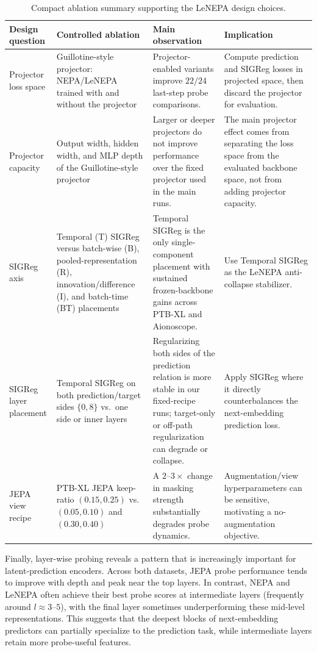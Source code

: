 \documentclass[sigconf,anonymous,review]{acmart}
\begin{document}
\begin{table}[t]
\centering
\small
\caption{Compact ablation summary supporting the LeNEPA design choices.}
\label{tab:ablation_summary}
\setlength{\tabcolsep}{4pt}
\renewcommand{\arraystretch}{1.12}
\begin{tabularx}{\textwidth}{p{} p{} p{} X}
\toprule
Design question & Controlled ablation & Main observation & Implication \\
\midrule
Projector loss space
& Guillotine-style projector: NEPA/LeNEPA trained with and without the projector
& Projector-enabled variants improve $22/24$ last-step probe comparisons.
& Compute prediction and SIGReg losses in projected space, then discard the projector for evaluation. \\
\addlinespace
Projector capacity
& Output width, hidden width, and MLP depth of the Guillotine-style projector
& Larger or deeper projectors do not improve performance over the fixed projector used in the main runs.
& The main projector effect comes from separating the loss space from the evaluated backbone space, not from adding projector capacity. \\
\addlinespace
SIGReg axis
& Temporal (T) SIGReg versus batch-wise (B), pooled-representation (R), innovation/difference (I), and batch-time (BT) placements
& Temporal SIGReg is the only single-component placement with sustained frozen-backbone gains across PTB-XL and Aionoscope.
& Use Temporal SIGReg as the LeNEPA anti-collapse stabilizer. \\
\addlinespace
SIGReg layer placement
& Temporal SIGReg on both prediction/target sides $\{0,8\}$ vs.\ one side or inner layers
& Regularizing both sides of the prediction relation is more stable in our fixed-recipe runs; target-only or off-path regularization can degrade or collapse.
& Apply SIGReg where it directly counterbalances the next-embedding prediction loss. \\
\addlinespace
JEPA view recipe
& PTB-XL JEPA keep-ratio $(0.15,0.25)$ vs.\ $(0.05,0.10)$ and $(0.30,0.40)$
& A $2$--$3\times$ change in masking strength substantially degrades probe dynamics.
& Augmentation/view hyperparameters can be sensitive, motivating a no-augmentation objective. \\
\bottomrule
\end{tabularx}
\end{table}

Finally, layer-wise probing reveals a pattern that is increasingly important for latent-prediction encoders.
Across both datasets, JEPA probe performance tends to improve with depth and peak near the top layers.
In contrast, NEPA and LeNEPA often achieve their best probe scores at intermediate layers (frequently around $l\approx3$--$5$), with the final layer sometimes underperforming these mid-level representations.
This suggests that the deepest blocks of next-embedding predictors can partially specialize to the prediction task, while intermediate layers retain more probe-useful features.
\end{document}
